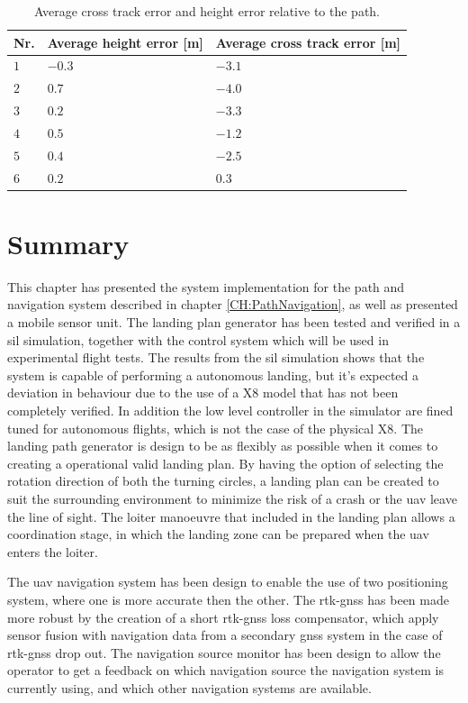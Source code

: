 \newpage
\begin{table}[H]
\centering
\begin{tabular}{| l | l | l |}
\hline
\textbf{Nr.} 	& \textbf{Average height error [m]} 	& \textbf{Average cross track error [m]}  \\ \hline
$1$				& $-0.3$							& $-3.1$								\\ \hline
$2$				& $0.7$							& $-4.0$								\\ \hline
$3$				& $0.2$							& $-3.3$								\\ \hline
$4$				& $0.5$							& $-1.2$								\\ \hline
$5$				& $0.4$							& $-2.5$								\\ \hline
$6$				& $0.2$							& $0.3$								\\ \hline
\end{tabular}
\caption{Average cross track error and height error relative to the path.}
\label{Tb:SILAverageCrossHeight}
\end{table}
\section{Summary}
This chapter has presented the system implementation for the path and navigation system described in chapter \ref{CH:PathNavigation}, as well as presented a mobile sensor unit. The landing plan generator has been tested and verified in a \gls{sil} simulation, together with the control system which will be used in experimental flight tests. The results from the \gls{sil} simulation shows that the system is capable of performing a autonomous landing, but it's expected a deviation in behaviour due to the use of a X8 model that has not been completely verified. In addition the low level controller in the simulator are fined tuned for autonomous flights, which is not the case of the physical X8. The landing path generator is design to be as flexibly as possible when it comes to creating a operational valid landing plan. By having the option of selecting the rotation direction of both the turning circles, a landing plan can be created to suit the surrounding environment to minimize the risk of a crash or the \gls{uav} leave the line of sight. The loiter manoeuvre that included in the landing plan allows a coordination stage, in which the landing zone can be prepared when the \gls{uav} enters the loiter. 

The \gls{uav} navigation system has been design to enable the use of two positioning system, where one is more accurate then the other. The \gls{rtk-gnss} has been made more robust by the creation of a short \gls{rtk-gnss} loss compensator, which apply sensor fusion with navigation data from a secondary \gls{gnss} system in the case of \gls{rtk-gnss} drop out. The navigation source monitor has been design to allow the operator to get a feedback on which navigation source the navigation system is currently using, and which other navigation systems are available.

